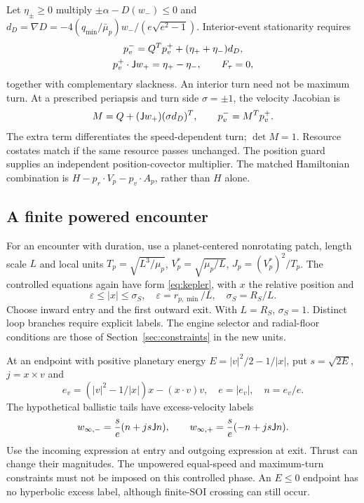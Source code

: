 Let $\eta_\pm\ge0$ multiply $\pm\alpha-D(w_-)\le0$ and
$d_D=\nabla D=-4(q_{\min}/\bar\mu_p)w_-/
(e\sqrt{e^2-1})$. Interior-event stationarity requires
\begin{equation}
 \begin{gathered}
 p_v^-=Q^Tp_v^++(\eta_++\eta_-)d_D,\\
 p_v^+\cdot\mathsf J w_+=\eta_+-\eta_-,\qquad F_\tau=0,
 \end{gathered}
\end{equation}
together with complementary slackness. An interior turn need not be
maximum turn. At a prescribed periapsis and turn side $\sigma=\pm1$,
the velocity Jacobian is
\begin{equation}
 M=Q+(\mathsf J w_+)(\sigma d_D)^T,\qquad p_v^-=M^Tp_v^+.
\end{equation}
The extra term differentiates the speed-dependent turn; $\det M=1$.
Resource costates match if the same resource passes unchanged.
The position guard supplies an independent position-covector multiplier.
The matched Hamiltonian combination is
$H-p_r\cdot V_p-p_v\cdot A_p$, rather than $H$ alone.

\subsection{A finite powered encounter}
For an encounter with duration, use a planet-centered nonrotating patch,
length scale $L$ and local units
$T_p=\sqrt{L^3/\mu_p}$, $V_p^*=\sqrt{\mu_p/L}$,
$J_p=(V_p^*)^2/T_p$.
The controlled equations again have form \eqref{eq:kepler}, with
$x$ the relative position and
\begin{equation}
 \varepsilon\le|x|\le\sigma_S,\quad
 \varepsilon=r_{p,\min}/L,\quad \sigma_S=R_S/L.
\end{equation}
Choose inward entry and the first outward exit. With $L=R_S$,
$\sigma_S=1$. Distinct loop branches require explicit labels.
The engine selector and radial-floor conditions are those of
Section~\ref{sec:constraints} in the new units.

At an endpoint with positive planetary energy
$E=|v|^2/2-1/|x|$, put $s=\sqrt{2E}$, $j=x\times v$ and
\begin{equation}
 e_v=(|v|^2-1/|x|)x-(x\cdot v)v,\quad e=|e_v|,\quad n=e_v/e.
\end{equation}
The hypothetical ballistic tails have excess-velocity labels
\begin{equation}
 w_{\infty,-}=\frac{s}{e}(n+js\mathsf J n),\qquad
 w_{\infty,+}=\frac{s}{e}(-n+js\mathsf J n).
\end{equation}
Use the incoming expression at entry and outgoing expression at exit.
Thrust can change their magnitudes. The unpowered equal-speed and
maximum-turn constraints must not be imposed on this controlled phase.
An $E\le0$ endpoint has no hyperbolic excess label, although finite-SOI
crossing can still occur.

